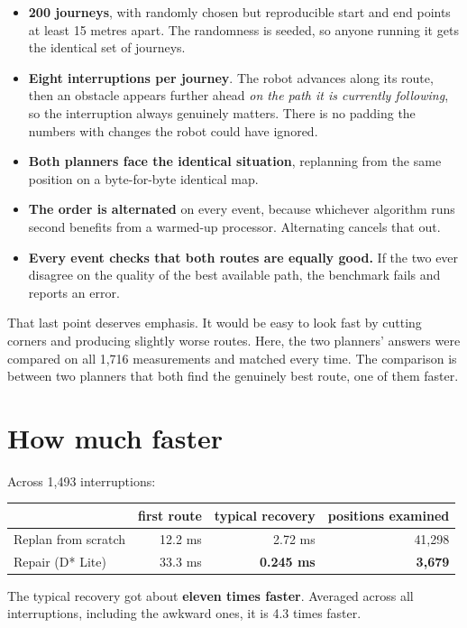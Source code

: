 \documentclass[11pt,a4paper]{article}
\begin{document}
\begin{itemize}[leftmargin=1.4em,itemsep=2pt]
\item \textbf{200 journeys}, with randomly chosen but reproducible start and end points at least 15 metres apart. The randomness is seeded, so anyone running it gets the identical set of journeys.
\item \textbf{Eight interruptions per journey}. The robot advances along its route, then an obstacle appears further ahead \emph{on the path it is currently following}, so the interruption always genuinely matters. There is no padding the numbers with changes the robot could have ignored.
\item \textbf{Both planners face the identical situation}, replanning from the same position on a byte-for-byte identical map.
\item \textbf{The order is alternated} on every event, because whichever algorithm runs second benefits from a warmed-up processor. Alternating cancels that out.
\item \textbf{Every event checks that both routes are equally good.} If the two ever disagree on the quality of the best available path, the benchmark fails and reports an error.
\end{itemize}

That last point deserves emphasis. It would be easy to look fast by cutting corners and producing slightly worse routes. Here, the two planners' answers were compared on all 1,716 measurements and matched every time. The comparison is between two planners that both find the genuinely best route, one of them faster.

\section{How much faster}

Across 1,493 interruptions:

\begin{center}
\small
\begin{tabular}{lrrr}
\toprule
& first route & typical recovery & positions examined \\
\midrule
Replan from scratch & 12.2 ms & 2.72 ms & 41,298 \\
Repair (D* Lite) & 33.3 ms & \textbf{0.245 ms} & \textbf{3,679} \\
\bottomrule
\end{tabular}
\end{center}

The typical recovery got about \textbf{eleven times faster}. Averaged across all interruptions, including the awkward ones, it is 4.3 times faster.
\end{document}
